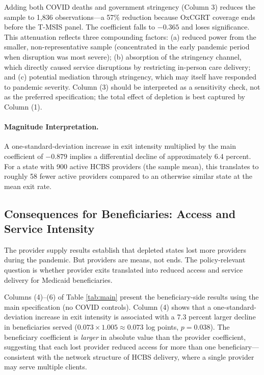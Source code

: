 \documentclass[12pt]{article}
\begin{document}
Adding both COVID deaths and government stringency (Column 3) reduces the sample to 1,836 observations---a 57\% reduction because OxCGRT coverage ends before the T-MSIS panel. The coefficient falls to $-0.365$ and loses significance. This attenuation reflects three compounding factors: (a) reduced power from the smaller, non-representative sample (concentrated in the early pandemic period when disruption was most severe); (b) absorption of the stringency channel, which directly caused service disruptions by restricting in-person care delivery; and (c) potential mediation through stringency, which may itself have responded to pandemic severity. Column (3) should be interpreted as a sensitivity check, not as the preferred specification; the total effect of depletion is best captured by Column (1).



\paragraph{Magnitude Interpretation.} A one-standard-deviation increase in exit intensity multiplied by the main coefficient of $-0.879$ implies a differential decline of approximately 6.4 percent. For a state with 900 active HCBS providers (the sample mean), this translates to roughly 58 fewer active providers compared to an otherwise similar state at the mean exit rate.

\subsection{Consequences for Beneficiaries: Access and Service Intensity}

The provider supply results establish that depleted states lost more providers during the pandemic. But providers are means, not ends. The policy-relevant question is whether provider exits translated into reduced access and service delivery for Medicaid beneficiaries.

Columns (4)--(6) of Table \ref{tab:main} present the beneficiary-side results using the main specification (no COVID controls). Column (4) shows that a one-standard-deviation increase in exit intensity is associated with a 7.3 percent larger decline in beneficiaries served ($0.073 \times 1.005 \approx 0.073$ log points, $p = 0.038$). The beneficiary coefficient is \emph{larger} in absolute value than the provider coefficient, suggesting that each lost provider reduced access for more than one beneficiary---consistent with the network structure of HCBS delivery, where a single provider may serve multiple clients.
\end{document}
